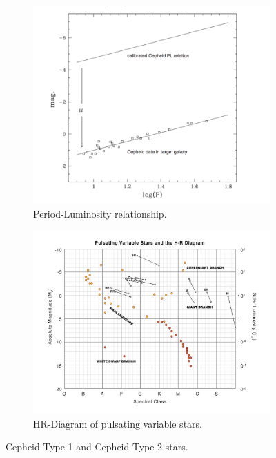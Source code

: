 \documentclass[letterpaper,11pt]{article}
\begin{document}
\begin{figure}[H]
\centering
\begin{subfigure}{.5\textwidth}
  \centering
  \includegraphics[width=.9\linewidth]{figures/Ngeow1_fig}
  \caption{Period-Luminosity relationship.}
  \label{fig:cephPL}
\end{subfigure}%
\begin{subfigure}{.5\textwidth}
  \centering
  \includegraphics[width=.9\linewidth]{figures/var_star_HR.png}
  \caption{HR-Diagram of pulsating variable stars.}
  \label{fig:var-star-hr}
\end{subfigure}
\caption{Cepheid Type 1 and Cepheid Type 2 stars.}
\label{fig:test}
\end{figure}
\end{document}
